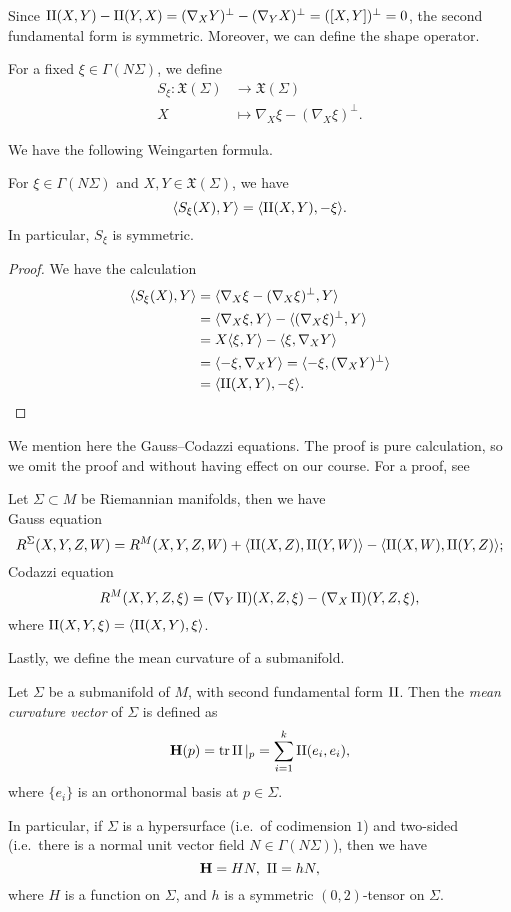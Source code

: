 Since $\operatorname{II}(X,Y)-\operatorname{II}(Y,X)=(\nabla_XY)^\perp-(\nabla_YX)^\perp=([X,Y])^\perp=0$, the second fundamental form is symmetric.
Moreover, we can define the shape operator.
\begin{defn}
    For a fixed $\xi\in\Gamma(N\Sigma)$, we define
    \begin{align*}
        S_\xi:\mathfrak{X}(\Sigma)&\to\mathfrak{X}(\Sigma)\\
        X&\mapsto\nabla_X\xi-(\nabla_X\xi)^\perp.
    \end{align*}
\end{defn}

We have the following Weingarten formula.
\begin{prop}
    For $\xi\in\Gamma(N\Sigma)$ and $X,Y\in\mathfrak{X}(\Sigma)$, we have
    \[\langle S_\xi(X),Y\rangle=\langle\operatorname{II}(X,Y),-\xi\rangle.\]
    In particular, $S_\xi$ is symmetric.
\end{prop}
\begin{proof}
    We have the calculation
    \begin{align*}
        \langle S_\xi(X),Y\rangle&=\langle\nabla_X\xi-(\nabla_X\xi)^\perp,Y\rangle\\
        &=\langle\nabla_X\xi,Y\rangle-\langle(\nabla_X\xi)^\perp,Y\rangle\\
        &=X\langle\xi,Y\rangle-\langle\xi,\nabla_XY\rangle\\
        &=\langle-\xi,\nabla_XY\rangle=\langle-\xi,(\nabla_XY)^\perp\rangle\\
        &=\langle\operatorname{II}(X,Y),-\xi\rangle.\qedhere
    \end{align*}
\end{proof}

We mention here the Gauss--Codazzi equations.
The proof is pure calculation, so we omit the proof and without having effect on our course.
For a proof, see~\cite[Theorem~3.2.4~and~3.2.5]{Petersen}
\begin{thm}
    Let $\Sigma\subset M$ be Riemannian manifolds, then we have\\
    Gauss equation
    \[R^\Sigma(X,Y,Z,W)=R^M(X,Y,Z,W)+\langle\operatorname{II}(X,Z),\operatorname{II}(Y,W)\rangle-\langle\operatorname{II}(X,W),\operatorname{II}(Y,Z)\rangle;\]
    Codazzi equation
    \[R^M(X,Y,Z,\xi)=(\nabla_Y\operatorname{II})(X,Z,\xi)-(\nabla_X\operatorname{II})(Y,Z,\xi),\]
    where $\operatorname{II}(X,Y,\xi)=\langle\operatorname{II}(X,Y),\xi\rangle$.
\end{thm}

Lastly, we define the mean curvature of a submanifold.
\begin{defn}
    Let $\Sigma$ be a submanifold of $M$, with second fundamental form $\operatorname{II}$.
    Then the \emph{mean curvature vector} of $\Sigma$ is defined as
    \[\mathbf{H}(p)=\operatorname{tr}\operatorname{II}|_p=\sum_{i=1}^k\operatorname{II}(e_i,e_i),\]
    where $\{e_i\}$ is an orthonormal basis at $p\in\Sigma$.

    In particular, if $\Sigma$ is a hypersurface (i.e.\ of codimension $1$) and two-sided (i.e.\ there is a normal unit vector field $N\in\Gamma(N\Sigma)$), then we have
    \[\mathbf{H}=HN,\ \II=hN,\]
    where $H$ is a function on $\Sigma$, and $h$ is a symmetric $(0,2)$-tensor on $\Sigma$.
\end{defn}

